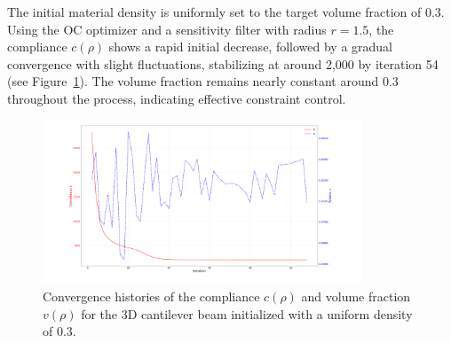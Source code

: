 \documentclass[mathpazo]{cicp}
\begin{document}
The initial material density is uniformly set to the target volume fraction of 0.3. Using the OC optimizer and a sensitivity filter with radius $r=1.5$, the compliance $c(\rho)$ shows a rapid initial decrease, followed by a gradual convergence with slight fluctuations, stabilizing at around 2,000 by iteration 54 (see Figure~\ref{fig:canti_3d_convergence}). The volume fraction remains nearly constant around 0.3 throughout the process, indicating effective constraint control.
\vspace{-2ex} %
\begin{figure}[htp]
	\centering
	\includegraphics[width=0.85\textwidth]{figures/cantilever_3d_convergence.png}
	\caption{Convergence histories of the compliance $c(\rho)$ and volume fraction $v(\rho)$ for the 3D cantilever beam initialized with a uniform density of 0.3.}
	\label{fig:canti_3d_convergence}
\end{figure}
\vspace{-2ex} %
\end{document}

